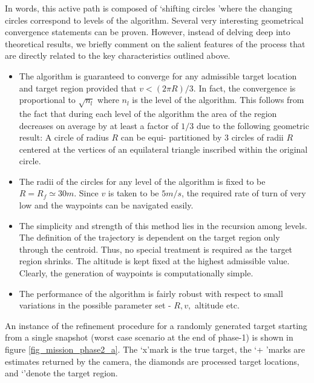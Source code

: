 In words, this active path is composed of \lq shifting circles \rq where the changing circles correspond to levels of the algorithm. Several very interesting geometrical convergence statements can be proven. However, instead of delving deep into theoretical results, we briefly comment on the salient features of the process that are directly related to the key characteristics outlined above. 

\begin{itemize}
\item The algorithm is guaranteed to converge for any admissible target location and target region provided that $v<(2\pi R)/3$. In fact, the convergence is proportional to $\sqrt{n_l}$ where $n_l$ is the level of the algorithm. This follows from the fact that during each level of the algorithm the area of the region decreases on average by at least a factor of $1/3$ due to the following geometric result: A circle of radius $R$ can be equi- partitioned by $3$ circles of radii $R$ centered at the vertices of an equilateral triangle inscribed within the original circle.

\item The radii of the circles for any level of the algorithm is fixed to be $R = R_f \simeq 30m$. Since $v$ is taken to be $5 m/s$, the required rate of turn of very low and the waypoints can be navigated easily.

\item The simplicity and strength of this method lies in the recursion among levels. The definition of the trajectory is dependent on the target region only through the centroid. Thus, no special treatment is required as the target region shrinks. The altitude is kept fixed at the highest admissible value. Clearly, the generation of waypoints is computationally simple.

\item The performance of the algorithm is fairly robust with respect to small variations in the possible parameter set - $R,v, $ altitude etc. 

\end{itemize}

An instance of the refinement procedure for a randomly generated target starting from a single snapshot (worst case scenario at the end of phase-1) is shown in figure \ref{fig_mission_phase2_a}. The \lq x\rq mark is the true target, the \lq + \rq marks are estimates returned by the camera, the diamonds are processed target locations, and \lq * \rq denote the target region. 

